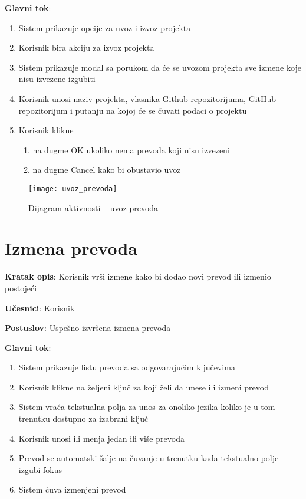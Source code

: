 \textbf{Glavni tok}:
\begin{enumerate}
    \item Sistem prikazuje opcije za uvoz i izvoz projekta
    \item Korisnik bira akciju za izvoz projekta
    \item Sistem prikazuje modal sa porukom da će se uvozom projekta sve 
    izmene koje nisu izvezene izgubiti
    \item Korisnik unosi naziv projekta, vlasnika Github repozitorijuma, 
    GitHub repozitorijum i putanju na kojoj će se čuvati podaci o projektu
    \item Korisnik klikne
    \begin{enumerate}
        \item na dugme OK ukoliko nema prevoda koji nisu izvezeni
        \item na dugme Cancel kako bi obustavio uvoz
    \end{enumerate}        
    
\end{enumerate}

\begin{figure}[H]
    \centering
    \texttt{[image: uvoz\_prevoda]}
    \caption{Dijagram aktivnosti -- uvoz prevoda}
\end{figure}


\section{Izmena prevoda}

\textbf{Kratak opis}: Korisnik vrši izmene kako bi dodao novi prevod ili izmenio postojeći

\textbf{Učesnici}: Korisnik

\textbf{Postuslov}: Uspešno izvršena izmena prevoda

\textbf{Glavni tok}:
\begin{enumerate}
    \item Sistem prikazuje listu prevoda sa odgovarajućim ključevima
    \item Korisnik klikne na željeni ključ za koji želi da unese ili izmeni prevod
    \item Sistem vraća tekstualna polja za unos za onoliko jezika koliko je u tom 
    trenutku dostupno za izabrani ključ
    \item Korisnik unosi ili menja jedan ili više prevoda
    \item Prevod se automatski šalje na čuvanje u trenutku kada tekstualno polje izgubi fokus
    \item Sistem čuva izmenjeni prevod
\end{enumerate}

